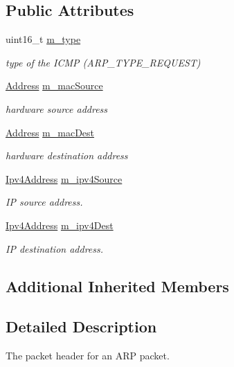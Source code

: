 \subsection*{Public Attributes}
\begin{DoxyCompactItemize}
\item 
uint16\+\_\+t \hyperlink{classns3_1_1ArpHeader_a8b5d651b2153bd85714a376df62e93e0}{m\+\_\+type}
\begin{DoxyCompactList}\small\item\em type of the I\+C\+MP (A\+R\+P\+\_\+\+T\+Y\+P\+E\+\_\+\+R\+E\+Q\+U\+E\+ST) \end{DoxyCompactList}\item 
\hyperlink{classns3_1_1Address}{Address} \hyperlink{classns3_1_1ArpHeader_a203567d8a9119ebb3d8f572627711467}{m\+\_\+mac\+Source}
\begin{DoxyCompactList}\small\item\em hardware source address \end{DoxyCompactList}\item 
\hyperlink{classns3_1_1Address}{Address} \hyperlink{classns3_1_1ArpHeader_ab30b05ca3579eab9ec112456a5d8fed9}{m\+\_\+mac\+Dest}
\begin{DoxyCompactList}\small\item\em hardware destination address \end{DoxyCompactList}\item 
\hyperlink{classns3_1_1Ipv4Address}{Ipv4\+Address} \hyperlink{classns3_1_1ArpHeader_aedf1d03e058ebff6ffdbcbe01582e4a5}{m\+\_\+ipv4\+Source}
\begin{DoxyCompactList}\small\item\em IP source address. \end{DoxyCompactList}\item 
\hyperlink{classns3_1_1Ipv4Address}{Ipv4\+Address} \hyperlink{classns3_1_1ArpHeader_acaf790c20dd771889204740c70c7fdc0}{m\+\_\+ipv4\+Dest}
\begin{DoxyCompactList}\small\item\em IP destination address. \end{DoxyCompactList}\end{DoxyCompactItemize}
\subsection*{Additional Inherited Members}


\subsection{Detailed Description}
The packet header for an A\+RP packet. 

